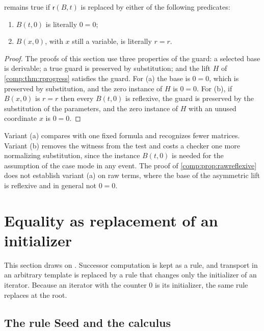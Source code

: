 \begin{proposition}
\label{comp:prop:rvariants}
 remains true if $\mathsf{r}(B,t)$ is replaced by
either of the following predicates:
\begin{enumerate}[label=(\alph*)]
\item $B(t,0)$ is literally $0=0$;
\item $B(x,0)$, with $x$ still a variable, is literally $r=r$.
\end{enumerate}
\end{proposition}

\begin{proof}
The proofs of this section use three properties of the guard: a selected
base is derivable; a true guard is preserved by substitution; and the lift
$H$ of \cref{comp:thm:rprogress} satisfies the guard. For (a) the base is
$0=0$, which is preserved by substitution, and the zero instance of $H$ is
$0=0$. For (b), if $B(x,0)$ is $r=r$ then every $B(t,0)$ is reflexive, the
guard is preserved by the substitution of the parameters, and the zero
instance of $H$ with an unused coordinate $x$ is $0=0$.
\end{proof}

Variant (a) compares with one fixed formula and recognizes fewer matrices.
Variant (b) removes the witness from the test and costs a checker one more
normalizing substitution, since the instance $B(t,0)$ is needed for the
assumption of the case mode in any event. The proof of
\cref{comp:prop:rawreflexive} does not establish variant (a) on raw terms,
where the base of the asymmetric lift is reflexive and in general not
$0=0$.

\section{Equality as replacement of an initializer}
\label{comp:sec:seed}

This section draws on . Successor computation is
kept as a rule, and transport in an arbitrary template is replaced by a rule
that changes only the initializer of an iterator. Because an iterator with
the counter $0$ is its initializer, the same rule replaces at the root.

\subsection{The rule Seed and the calculus}

